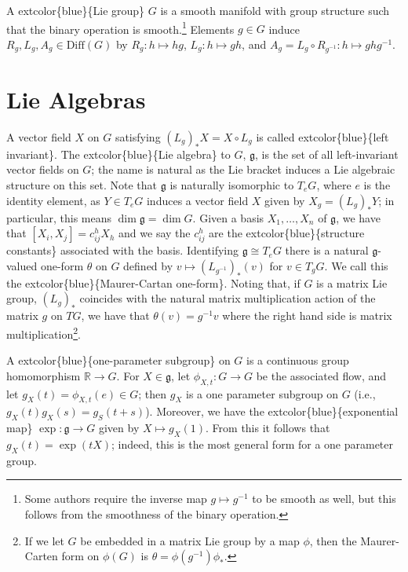 \documentclass[
]{book}
\begin{document}
A extcolor\{blue\}\{Lie group\} \(G\) is a smooth manifold with group structure such that the binary operation is smooth.\footnote{Some authors require the inverse map \(g \mapsto g^{-1}\) to be smooth as well, but this follows from the smoothness of the binary operation.}
Elements \(g \in G\) induce \(R_g, L_g, A_g \in \text{Diff}(G)\) by \(R_g : h \mapsto hg\), \(L_g : h \mapsto gh\), and \(A_g = L_g \circ R_{g^{-1}} : h \mapsto ghg^{-1}\).

\hypertarget{lie-algebras}{%
\section{Lie Algebras}\label{lie-algebras}}

A vector field \(X\) on \(G\) satisfying \((L_g)_* X = X \circ L_g\) is called extcolor\{blue\}\{left invariant\}.
The extcolor\{blue\}\{Lie algebra\} to \(G\), \(\mathfrak{g}\), is the set of all left-invariant vector fields on \(G\); the name is natural as the Lie bracket induces a Lie algebraic structure on this set.
Note that \(\mathfrak{g}\) is naturally isomorphic to \(T_e G\), where \(e\) is the identity element, as \(Y \in T_e G\) induces a vector field \(X\) given by \(X_g = (L_g)_* Y\); in particular, this means \(\dim \mathfrak{g} = \dim G\).
Given a basis \(X_1, \dots, X_n\) of \(\mathfrak{g}\), we have that \([X_i, X_j] = c_{ij}^h X_h\) and we say the \(c_{ij}^h\) are the extcolor\{blue\}\{structure constants\} associated with the basis.
Identifying \(\mathfrak{g} \cong T_e G\) there is a natural \(\mathfrak{g}\)-valued one-form \(\theta\) on \(G\) defined by \(v \mapsto (L_{g^{-1}})_*(v)\) for \(v \in T_g G\).
We call this the extcolor\{blue\}\{Maurer-Cartan one-form\}.
Noting that, if \(G\) is a matrix Lie group, \((L_g)_*\) coincides with the natural matrix multiplication action of the matrix \(g\) on \(TG\), we have that \(\theta(v) = g^{-1}v\) where the right hand side is matrix multiplication\footnote{If we let \(G\) be embedded in a matrix Lie group by a map \(\phi\), then the Maurer-Carten form on \(\phi(G)\) is \(\theta = \phi(g^{-1})\phi_*\).}.

A extcolor\{blue\}\{one-parameter subgroup\} on \(G\) is a continuous group homomorphism \(\mathbb{R} \to G\). For \(X \in \mathfrak{g}\), let \(\phi_{X,t} : G \to G\) be the associated flow, and let \(g_X(t) = \phi_{X,t}(e) \in G\); then \(g_X\) is a one parameter subgroup on \(G\) (i.e., \(g_X(t)g_X(s) = g_S(t+s)\)).
Moreover, we have the extcolor\{blue\}\{exponential map\} \(\exp : \mathfrak{g} \to G\) given by \(X \mapsto g_X(1)\).
From this it follows that \(g_X(t) = \exp(tX)\); indeed, this is the most general form for a one parameter group.
\end{document}
